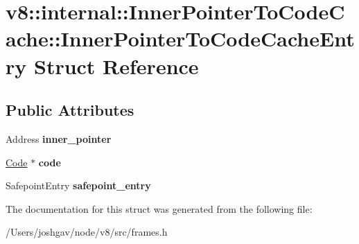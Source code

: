 \hypertarget{structv8_1_1internal_1_1_inner_pointer_to_code_cache_1_1_inner_pointer_to_code_cache_entry}{}\section{v8\+:\+:internal\+:\+:Inner\+Pointer\+To\+Code\+Cache\+:\+:Inner\+Pointer\+To\+Code\+Cache\+Entry Struct Reference}
\label{structv8_1_1internal_1_1_inner_pointer_to_code_cache_1_1_inner_pointer_to_code_cache_entry}
\subsection*{Public Attributes}
\begin{DoxyCompactItemize}
\item 
Address {\bfseries inner\+\_\+pointer}\hypertarget{structv8_1_1internal_1_1_inner_pointer_to_code_cache_1_1_inner_pointer_to_code_cache_entry_aa31c0b698b8935a0a890cd550f3b61c1}{}\label{structv8_1_1internal_1_1_inner_pointer_to_code_cache_1_1_inner_pointer_to_code_cache_entry_aa31c0b698b8935a0a890cd550f3b61c1}

\item 
\hyperlink{classv8_1_1internal_1_1_code}{Code} $\ast$ {\bfseries code}\hypertarget{structv8_1_1internal_1_1_inner_pointer_to_code_cache_1_1_inner_pointer_to_code_cache_entry_acaa0672bd9e3a8f5572ea7247ff890ac}{}\label{structv8_1_1internal_1_1_inner_pointer_to_code_cache_1_1_inner_pointer_to_code_cache_entry_acaa0672bd9e3a8f5572ea7247ff890ac}

\item 
Safepoint\+Entry {\bfseries safepoint\+\_\+entry}\hypertarget{structv8_1_1internal_1_1_inner_pointer_to_code_cache_1_1_inner_pointer_to_code_cache_entry_a16d432760b60d92721b309f0d01b8837}{}\label{structv8_1_1internal_1_1_inner_pointer_to_code_cache_1_1_inner_pointer_to_code_cache_entry_a16d432760b60d92721b309f0d01b8837}

\end{DoxyCompactItemize}


The documentation for this struct was generated from the following file\+:\begin{DoxyCompactItemize}
\item 
/\+Users/joshgav/node/v8/src/frames.\+h\end{DoxyCompactItemize}
